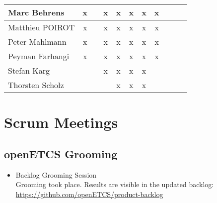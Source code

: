 \documentclass[a4paper, 11pt]{article}
\begin{document}
\begin{tabular}{|l|c|c|c|c||c|c|c||c|c|c|}
Marc Behrens         & x &   & x & x & x & x & x  \\\hline
Matthieu POIROT       & x  &   & x  & x & x & x & x  \\\hline
Peter Mahlmann       & x &   & x & x & x & x & x \\\hline
Peyman Farhangi      & x  &   & x & x & x & x & x  \\\hline
Stefan Karg          &   &   & x  & x & x & x &  \\\hline
Thorsten Scholz      &   &   &  & x & x & x &  \\\hline
\end{tabular}


\section{Scrum Meetings}

\subsection{openETCS Grooming}
\begin{itemize}
\item Backlog Grooming Session\\
Grooming took place. Results are visible in the updated backlog:\\
\url{https://github.com/openETCS/product-backlog}

\end{itemize}
\end{document}
